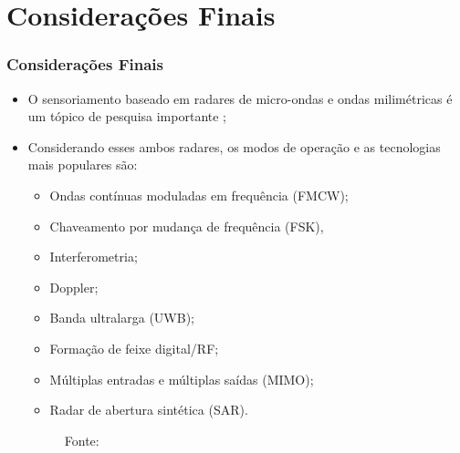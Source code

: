 \documentclass[xcolor=dvipsnames, aspectratio=169]{beamer}
\begin{document}
\section[Considerações Finais]{Considerações Finais} 
\begin{frame}
\frametitle{Considerações Finais}
	\begin{itemize}
		\item O sensoriamento baseado em radares de micro-ondas e ondas milimétricas é um tópico de pesquisa importante \cite{cardillo_2023};
        \item Considerando esses ambos radares, os modos de operação e as tecnologias mais populares são:
        \begin{itemize}
            \item Ondas contínuas moduladas em frequência (FMCW); 
            \item Chaveamento por mudança de frequência (FSK), 
            \item Interferometria; 
            \item Doppler;
            \item Banda ultralarga (UWB); 
            \item Formação de feixe digital/RF;
            \item Múltiplas entradas e múltiplas saídas (MIMO);
            \item Radar de abertura sintética (SAR).
        \end{itemize}

        \begin{figure}
            \centering
            {Fonte: \cite{cardillo_2023}}
            \label{fig:tc_microwave}
        \end{figure}

	\end{itemize}
\end{frame}


\begin{frame}
    \printbibliography
\end{frame}


\begin{frame}
\titlepage %
\end{frame}
\end{document}
